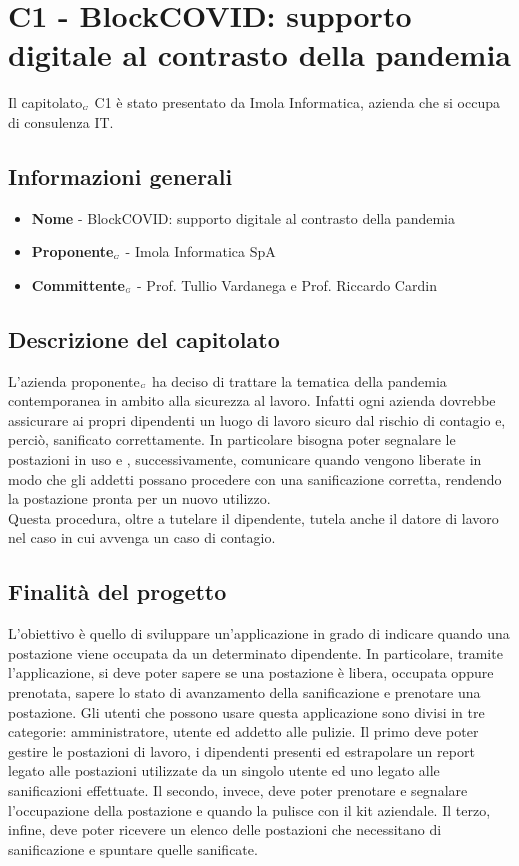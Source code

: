 \chapter{C1 - BlockCOVID: supporto digitale al contrasto della pandemia} \label{CapitolatoC1}

Il capitolato$_{\scaleto{G}{3pt}}$ C1 è stato presentato da Imola Informatica, azienda che si occupa di consulenza IT.

\section{Informazioni generali} \label{C1InformazioniGenerali}
\begin{itemize}
	\item \textbf{Nome} - BlockCOVID: supporto digitale al contrasto della pandemia
	\item \textbf{Proponente}$_{\scaleto{G}{3pt}}$ - Imola Informatica SpA
	\item \textbf{Committente}$_{\scaleto{G}{3pt}}$ - Prof. Tullio Vardanega e Prof. Riccardo Cardin
\end{itemize}
\section{Descrizione del capitolato} \label{C1DescrizioneDelCapitolato}
L'azienda proponente$_{\scaleto{G}{3pt}}$ ha deciso di trattare la tematica della pandemia contemporanea in ambito alla sicurezza al lavoro. Infatti ogni azienda dovrebbe assicurare ai propri dipendenti un luogo di lavoro sicuro dal rischio di contagio e, perciò, sanificato correttamente. In particolare bisogna poter segnalare le postazioni in uso e , successivamente, comunicare quando vengono liberate in modo che gli addetti possano procedere con una sanificazione corretta, rendendo la postazione pronta per un nuovo utilizzo.\\
Questa procedura, oltre a tutelare il dipendente, tutela anche il datore di lavoro nel caso in cui avvenga un caso di contagio.
\section{Finalità del progetto} \label{C1FinalitàDelProgetto}
L'obiettivo è quello di sviluppare un'applicazione in grado di indicare quando una postazione viene occupata da un determinato dipendente. In particolare, tramite l'applicazione, si deve poter sapere se una postazione è libera, occupata oppure prenotata, sapere lo stato di avanzamento della sanificazione e prenotare una postazione. Gli utenti che possono usare questa applicazione sono divisi in tre categorie: amministratore, utente ed addetto alle pulizie. Il primo deve poter gestire le postazioni di lavoro, i dipendenti presenti ed estrapolare un report legato alle postazioni utilizzate da un singolo utente ed uno legato alle sanificazioni effettuate. Il secondo, invece, deve poter prenotare e segnalare l'occupazione della postazione e quando la pulisce con il kit aziendale. Il terzo, infine, deve poter ricevere un elenco delle postazioni che necessitano di sanificazione e spuntare quelle sanificate.
